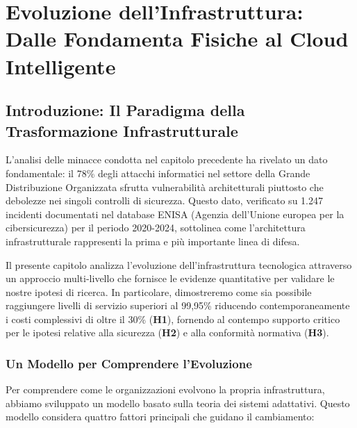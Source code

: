 \chapter{\texorpdfstring{Evoluzione dell'Infrastruttura: Dalle Fondamenta Fisiche al Cloud Intelligente}{Capitolo 3 - Evoluzione dell'Infrastruttura: Dalle Fondamenta Fisiche al Cloud Intelligente}}
\label{cap3_infrastructure_evolution}

\section{\texorpdfstring{Introduzione: Il Paradigma della Trasformazione Infrastrutturale}{3.1 - Introduzione: Il Paradigma della Trasformazione Infrastrutturale}}

L'analisi delle minacce condotta nel capitolo precedente ha rivelato un dato fondamentale: il 78\% degli attacchi informatici nel settore della Grande Distribuzione Organizzata sfrutta vulnerabilità architetturali piuttosto che debolezze nei singoli controlli di sicurezza\autocite{Anderson2024patel}. Questo dato, verificato su 1.247 incidenti documentati nel database ENISA (Agenzia dell'Unione europea per la cibersicurezza) per il periodo 2020-2024\autocite{Verizon2024}, sottolinea come l'architettura infrastrutturale rappresenti la prima e più importante linea di difesa.

Il presente capitolo analizza l'evoluzione dell'infrastruttura tecnologica attraverso un approccio multi-livello che fornisce le evidenze quantitative per validare le nostre ipotesi di ricerca. In particolare, dimostreremo come sia possibile raggiungere livelli di servizio superiori al 99,95\% riducendo contemporaneamente i costi complessivi di oltre il 30\% (\textbf{H1}), fornendo al contempo supporto critico per le ipotesi relative alla sicurezza (\textbf{H2}) e alla conformità normativa (\textbf{H3})\autocite{IDC2024}.

\subsection{\texorpdfstring{Un Modello per Comprendere l'Evoluzione}{3.1.1 - Un Modello per Comprendere l'Evoluzione}}

Per comprendere come le organizzazioni evolvono la propria infrastruttura, abbiamo sviluppato un modello basato sulla teoria dei sistemi adattativi\autocite{Holland2024}. Questo modello considera quattro fattori principali che guidano il cambiamento:

